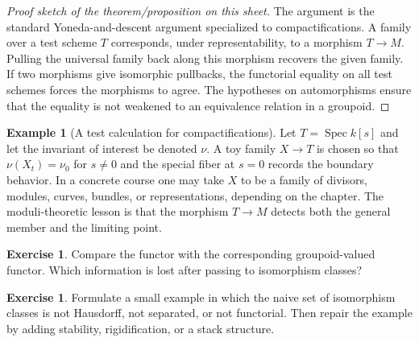 \documentclass[11pt]{amsart}
\theoremstyle{definition}
\newtheorem{example}[theorem]{Example}
\newtheorem{exercise}[theorem]{Exercise}
\newcommand{\Spec}{\operatorname{Spec}}
\begin{document}
\begin{proof}[Proof sketch of the theorem/proposition on this sheet]
The argument is the standard Yoneda-and-descent argument specialized to compactifications.  A family over a test scheme $T$ corresponds, under representability, to a morphism $T\to M$.  Pulling the universal family back along this morphism recovers the given family.  If two morphisms give isomorphic pullbacks, the functorial equality on all test schemes forces the morphisms to agree.  The hypotheses on automorphisms ensure that the equality is not weakened to an equivalence relation in a groupoid.
\end{proof}
\begin{example}[A test calculation for compactifications]
Let $T=\Spec k[s]$ and let the invariant of interest be denoted $\nu$.  A toy family $X\to T$ is chosen so that $\nu(X_t)=\nu_0$ for $s\ne0$ and the special fiber at $s=0$ records the boundary behavior.  In a concrete course one may take $X$ to be a family of divisors, modules, curves, bundles, or representations, depending on the chapter.  The moduli-theoretic lesson is that the morphism $T\to M$ detects both the general member and the limiting point.
\end{example}
\begin{exercise}
Compare the functor with the corresponding groupoid-valued functor.  Which information is lost after passing to isomorphism classes?
\end{exercise}
\begin{exercise}
Formulate a small example in which the naive set of isomorphism classes is not Hausdorff, not separated, or not functorial.  Then repair the example by adding stability, rigidification, or a stack structure.
\end{exercise}
\clearpage
\end{document}
